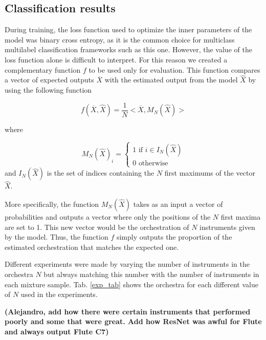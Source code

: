 \documentclass{article}
\begin{document}
\subsection{Classification results}

During training, the loss function used to optimize the inner parameters of the model was binary cross entropy, as it is the common choice for multiclass multilabel classification frameworks such as this one. However, the value of the loss function alone is difficult to interpret. For this reason we created a complementary function $f$ to be used only for evaluation. This function compares a vector of expected outputs $\overline{X}$ with the estimated output from the model $\hat{X}$ by using the following function

\begin{equation}
f(\overline{X}, \hat{X}) = \frac{1}{N}<\overline{X}, M_N(\hat{X})>
\label{eval}
\end{equation}

where

\begin{equation}
M_N(\hat{X})_i = \left\{\begin{array}{ll}
1 \text{ if } i \in I_N(\hat{X})\\
0 \text{ otherwise}
\end{array}\right.
\label{NMax}
\end{equation}
and $I_N(\hat{X})$ is the set of indices containing the $N$ first maximums of the vector $\hat{X}$.

More specifically, the function $M_N(\hat{X})$ takes as an input a vector of probabilities and outputs a vector where only the positions of the $N$ first maxima are set to 1. This new vector would be the orchestration of $N$ instruments given by the model. Thus, the function $f$ simply outputs the proportion of the estimated orchestration that matches the expected one.

Different experiments were made by varying the number of instruments in the orchestra $N$ but always matching this number with the number of instruments in each mixture sample. Tab. \ref{exp_tab} shows the orchestra for each different value of $N$ used in the experiments.

\textbf{(Alejandro, add how there were certain instruments that performed poorly and some that were great. Add how ResNet was awful for Flute and always output Flute C7)}
\end{document}
